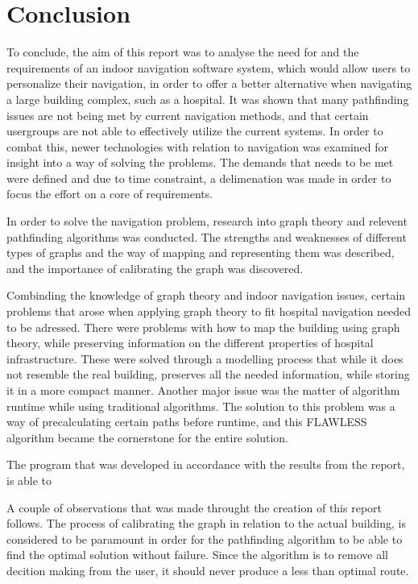 \chapter{Conclusion}

To conclude, the aim of this report was to analyse the need for and the requirements of an indoor navigation software system, which would allow users to personalize their navigation, in order to offer a better alternative when navigating a large building complex, such as a hospital. It was shown that many pathfinding issues are not being met by current navigation methods, and that certain usergroups are not able to effectively utilize the current systems. In order to combat this, newer technologies with relation to navigation was examined for insight into a way of solving the problems. The demands that needs to be met were defined and due to time constraint, a delimenation was made in order to focus the effort on a core of requirements.

In order to solve the navigation problem, research into graph theory and relevent pathfinding algorithms was conducted. The strengths and weaknesses of different types of graphs and the way of mapping and representing them was described, and the importance of calibrating the graph was discovered. 

Combinding the knowledge of graph theory and indoor navigation issues, certain problems that arose when applying graph theory to fit hospital navigation needed to be adressed. There were problems with how to map the building using graph theory, while preserving information on the different properties of hospital infrastructure. These were solved through a modelling process that while it does not resemble the real building, preserves all the needed information, while storing it in a more compact manner. Another major issue was the matter of algorithm runtime while using traditional algorithms. The solution to this problem was a way of precalculating certain paths before runtime, and this FLAWLESS algorithm became the cornerstone for the entire solution.

The program that was developed in accordance with the results from the report, is able to 

A couple of observations that was made throught the creation of this report follows. The process of calibrating the graph in relation to the actual building, is considered to be paramount in order for the pathfinding algorithm to be able to find the optimal solution without failure. Since the algorithm is to remove all decition making from the user, it should never produce a less than optimal route.